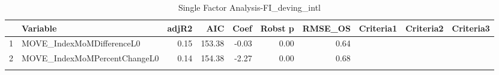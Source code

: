 \begin{longtable}{rlrrrrrlll}
  \hline
 & Variable & adjR2 & AIC & Coef & Robst p & RMSE\_OS & Criteria1 & Criteria2 & Criteria3 \\ 
  \hline
1 & MOVE\_IndexMoMDifferenceL0 & 0.15 & 153.38 & -0.03 & 0.00 & 0.64 &  &  &  \\ 
  2 & MOVE\_IndexMoMPercentChangeL0 & 0.14 & 154.38 & -2.27 & 0.00 & 0.68 &  &  &  \\ 
   \hline
\hline
\caption{Single Factor Analysis-FI_deving_intl} 
\end{longtable}
